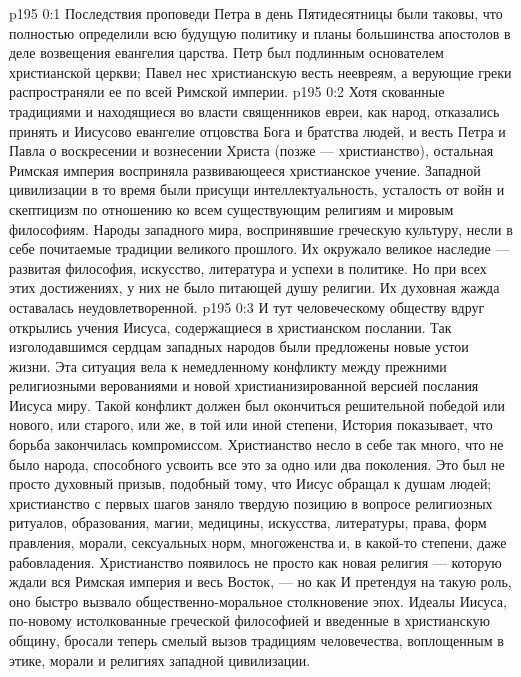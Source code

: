 \author{Комиссия срединников}
\vs p195 0:1 Последствия проповеди Петра в день Пятидесятницы были таковы, что полностью определили всю будущую политику и планы большинства апостолов в деле возвещения евангелия царства. Петр был подлинным основателем христианской церкви; Павел нес христианскую весть неевреям, а верующие греки распространяли ее по всей Римской империи.
\vs p195 0:2 Хотя скованные традициями и находящиеся во власти священников евреи, как народ, отказались принять и Иисусово евангелие отцовства Бога и братства людей, и весть Петра и Павла о воскресении и вознесении Христа (позже --- христианство), остальная Римская империя восприняла развивающееся христианское учение. Западной цивилизации в то время были присущи интеллектуальность, усталость от войн и скептицизм по отношению ко всем существующим религиям и мировым философиям. Народы западного мира, воспринявшие греческую культуру, несли в себе почитаемые традиции великого прошлого. Их окружало великое наследие --- развитая философия, искусство, литература и успехи в политике. Но при всех этих достижениях, у них не было питающей душу религии. Их духовная жажда оставалась неудовлетворенной.
\vs p195 0:3 И тут человеческому обществу вдруг открылись учения Иисуса, содержащиеся в христианском послании. Так изголодавшимся сердцам западных народов были предложены новые устои жизни. Эта ситуация вела к немедленному конфликту между прежними религиозными верованиями и новой христианизированной версией послания Иисуса миру. Такой конфликт должен был окончиться решительной победой или нового, или старого, или же, в той или иной степени,  История показывает, что борьба закончилась компромиссом. Христианство несло в себе так много, что не было народа, способного усвоить все это за одно или два поколения. Это был не просто духовный призыв, подобный тому, что Иисус обращал к душам людей; христианство с первых шагов заняло твердую позицию в вопросе религиозных ритуалов, образования, магии, медицины, искусства, литературы, права, форм правления, морали, сексуальных норм, многоженства и, в какой\hyp{}то степени, даже рабовладения. Христианство появилось не просто как новая религия --- которую ждали вся Римская империя и весь Восток, --- но как  И претендуя на такую роль, оно быстро вызвало общественно\hyp{}моральное столкновение эпох. Идеалы Иисуса, по\hyp{}новому истолкованные греческой философией и введенные в христианскую общину, бросали теперь смелый вызов традициям человечества, воплощенным в этике, морали и религиях западной цивилизации.
